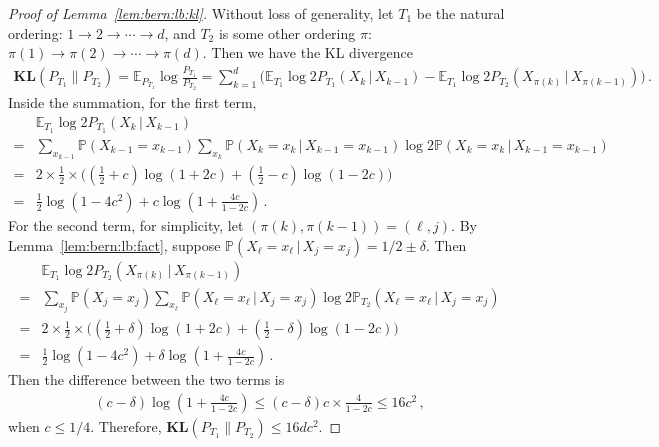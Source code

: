 \documentclass{article}
\theoremstyle{definition}
\theoremstyle{definition}
\theoremstyle{definition}
\theoremstyle{definition}
\theoremstyle{definition}
\theoremstyle{definition}
\theoremstyle{remark}
\theoremstyle{remark}
\newcommand{\E}{\mathbb{E}}
\newcommand{\prob}{\mathbb{P}}
\newcommand{\given}{\,|\,}
\newcommand{\dd}{d}
\begin{document}
\begin{proof}[Proof of Lemma~\ref{lem:bern:lb:kl}]
Without loss of generality, let $T_1$ be the natural ordering: $1\to 2\to \cdots \to \dd$, and $T_2$ is some other ordering $\pi$: $\pi(1)\to \pi(2)\to \cdots \to \pi(\dd)$. Then we have the KL divergence
\begin{align*}
    \mathbf{KL}(P_{T_1}\| P_{T_2}) = \E_{P_{T_1}} \log \frac{P_{T_1}}{P_{T_2}} = \sum_{k=1}^\dd \bigg( \E_{T_1}\log 2P_{T_1}(X_k\given X_{k-1}) - \E_{T_1}\log 2P_{T_2}(X_{\pi(k)}\given X_{\pi(k-1)}) \bigg) \,.
\end{align*}
Inside the summation, for the first term, 
\begin{align*}
    & \E_{T_1}\log 2P_{T_1}(X_k\given X_{k-1}) \\
    = &  \sum_{x_{k-1}}\prob(X_{k-1}=x_{k-1}) \sum_{x_k} \prob(X_k=x_k\given X_{k-1}=x_{k-1}) \log 2\prob(X_k=x_k\given X_{k-1}=x_{k-1}) \\
    = & 2 \times \frac{1}{2} \times \bigg( (\frac{1}{2}+c)\log (1+2c) + (\frac{1}{2}-c)\log(1-2c) \bigg) \\
    =& \frac{1}{2}\log(1-4c^2) + c \log (1 + \frac{4c}{1-2c}) \,.
\end{align*}
For the second term, for simplicity, let $(\pi(k),\pi(k-1))=(\ell,j)$. By Lemma~\ref{lem:bern:lb:fact}, suppose $\prob(X_\ell=x_\ell\given X_j=x_j)=1/2\pm\delta$. Then
\begin{align*}
    & \E_{T_1}\log 2P_{T_2}(X_{\pi(k)}\given X_{\pi(k-1)}) \\
    =& \sum_{x_j}\prob(X_j=x_j)\sum_{x_\ell}\prob(X_\ell=x_\ell\given X_j=x_j)\log 2\prob_{T_2}(X_\ell=x_\ell\given X_j=x_j) \\
    =& 2 \times \frac{1}{2} \times \bigg( (\frac{1}{2}+\delta)\log (1+2c) + (\frac{1}{2}-\delta)\log(1-2c) \bigg) \\
    =& \frac{1}{2}\log(1-4c^2) + \delta \log (1 + \frac{4c}{1-2c}) \,.
\end{align*}
Then the difference between the two terms is
\begin{align*}
    (c-\delta) \log (1 + \frac{4c}{1-2c}) \le (c-\delta)c \times \frac{4}{1-2c} \le 16c^2\,,
\end{align*}
when $c\le 1/4$. Therefore, $\mathbf{KL}(P_{T_1}\| P_{T_2})\le 16\dd c^2$.
\end{proof}
\end{document}
